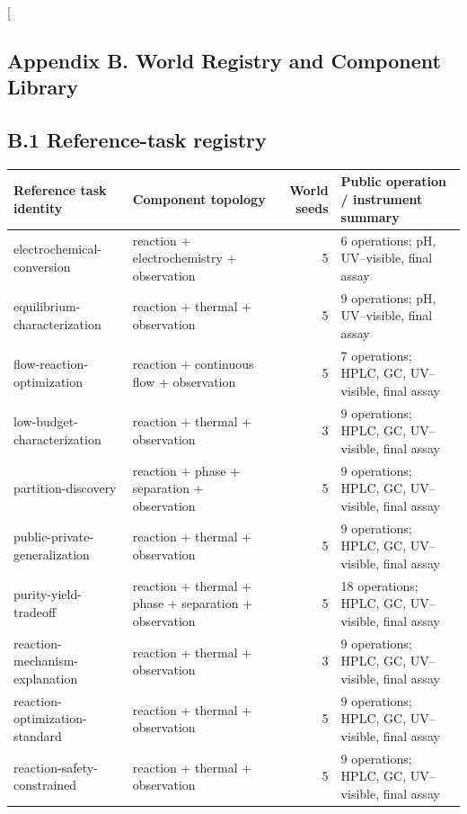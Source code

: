 \documentclass[10pt,twocolumn]{article}
\begin{document}
\clearpage
\nobalance
\twocolumn[
\begin{@twocolumnfalse}
\section{Appendix B. World Registry and Component Library}\label{appendix-b}
\subsection{B.1 Reference-task registry}\label{appendix-b.1-reference-task-registry}
\centering
\scriptsize
\captionsetup{hypcap=false}
\label{tab:reference-registry}
\begin{tabularx}{\textwidth}{@{}L{0.22\textwidth}L{0.32\textwidth}rY@{}}
\toprule
Reference task identity & Component topology & World seeds & Public operation / instrument summary \\
\midrule
electrochemical-conversion & reaction + electrochemistry + observation & 5 & 6 operations; pH, UV--visible, final assay \\
equilibrium-characterization & reaction + thermal + observation & 5 & 9 operations; pH, UV--visible, final assay \\
flow-reaction-optimization & reaction + continuous flow + observation & 5 & 7 operations; HPLC, GC, UV--visible, final assay \\
low-budget-characterization & reaction + thermal + observation & 3 & 9 operations; HPLC, GC, UV--visible, final assay \\
partition-discovery & reaction + phase + separation + observation & 5 & 9 operations; HPLC, GC, UV--visible, final assay \\
public-private-generalization & reaction + thermal + observation & 5 & 9 operations; HPLC, GC, UV--visible, final assay \\
purity-yield-tradeoff & reaction + thermal + phase + separation + observation & 5 & 18 operations; HPLC, GC, UV--visible, final assay \\
reaction-mechanism-explanation & reaction + thermal + observation & 3 & 9 operations; HPLC, GC, UV--visible, final assay \\
reaction-optimization-standard & reaction + thermal + observation & 5 & 9 operations; HPLC, GC, UV--visible, final assay \\
reaction-safety-constrained & reaction + thermal + observation & 5 & 9 operations; HPLC, GC, UV--visible, final assay \\

\end{tabularx}
\end{@twocolumnfalse}
\end{document}
